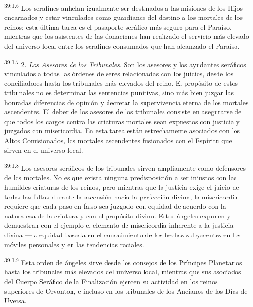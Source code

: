 \par
\textsuperscript{39:1.6} Los serafines anhelan igualmente ser destinados a las misiones de los Hijos encarnados y estar vinculados como guardianes del destino a los mortales de los reinos; esta última tarea es el pasaporte seráfico más seguro para el Paraíso, mientras que los asistentes de las donaciones han realizado el servicio más elevado del universo local entre los serafines consumados que han alcanzado el Paraíso.

\par
\textsuperscript{39:1.7} 2. \textit{Los Asesores de los Tribunales}. Son los asesores y los ayudantes seráficos vinculados a todas las órdenes de seres relacionadas con los juicios, desde los conciliadores hasta los tribunales más elevados del reino. El propósito de estos tribunales no es determinar las sentencias punitivas, sino más bien juzgar las honradas diferencias de opinión y decretar la supervivencia eterna de los mortales ascendentes. El deber de los asesores de los tribunales consiste en asegurarse de que todos los cargos contra las criaturas mortales sean expuestos con justicia y juzgados con misericordia. En esta tarea están estrechamente asociados con los Altos Comisionados, los mortales ascendentes fusionados con el Espíritu que sirven en el universo local.

\par
\textsuperscript{39:1.8} Los asesores seráficos de los tribunales sirven ampliamente como defensores de los mortales. No es que exista ninguna predisposición a ser injustos con las humildes criaturas de los reinos, pero mientras que la justicia exige el juicio de todas las faltas durante la ascensión hacia la perfección divina, la misericordia requiere que cada paso en falso sea juzgado con equidad de acuerdo con la naturaleza de la criatura y con el propósito divino. Estos ángeles exponen y demuestran con el ejemplo el elemento de misericordia inherente a la justicia divina ---la equidad basada en el conocimiento de los hechos subyacentes en los móviles personales y en las tendencias raciales.

\par
\textsuperscript{39:1.9} Esta orden de ángeles sirve desde los consejos de los Príncipes Planetarios hasta los tribunales más elevados del universo local, mientras que sus asociados del Cuerpo Seráfico de la Finalización ejercen su actividad en los reinos superiores de Orvonton, e incluso en los tribunales de los Ancianos de los Días de Uversa.

